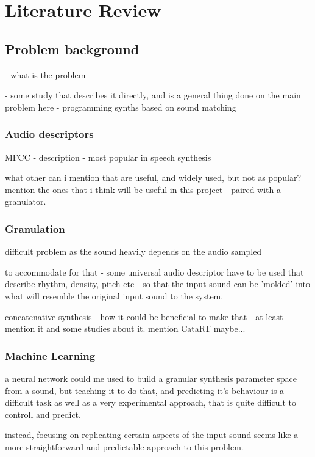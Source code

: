 \chapter{Literature Review}
\label{chapterlabel2}

\section{Problem background}
- what is the problem

- some study that describes it directly, and is a general thing done on the main
problem here - programming synths based on sound matching

\subsection{Audio descriptors}
MFCC - description - most popular in speech synthesis

what other can i mention that are useful, and widely used, but not as popular?
mention the ones that i think will be useful in this project - paired with a granulator.

\subsection{Granulation}
difficult problem as the sound heavily depends on the audio sampled

to accommodate for that - some universal audio descriptor have to be used that
describe rhythm, density, pitch etc - so that the input sound can be 'molded'
into what will resemble the original input sound to the system. 

concatenative synthesis - how it could be beneficial to make that - at least
mention it and some studies about it. mention CataRT maybe...

\subsection{Machine Learning}
a neural network could me used to build a granular synthesis parameter space
from a sound, but teaching it to do that, and predicting it's behaviour is a
difficult task as well as a very experimental approach, that is quite difficult
to controll and predict.

instead, focusing on replicating certain aspects of the input sound seems like a
more straightforward and predictable approach to this problem.

